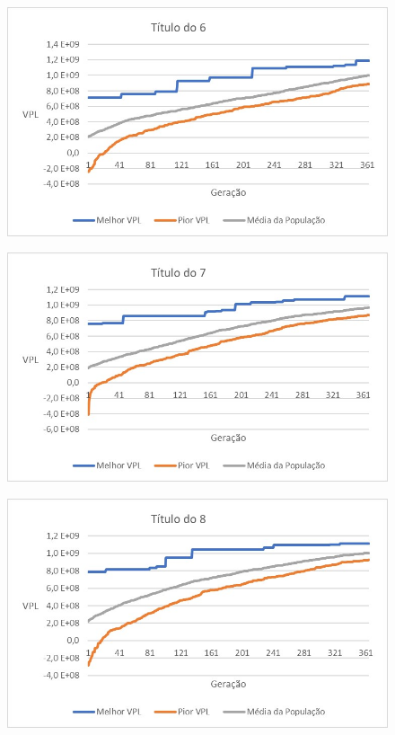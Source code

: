 \documentclass[12pt,a4paper]{report}
\begin{document}
\begin{figure}[H]
\centering

\includegraphics[scale=1]{ApD/6}

\end{figure}

\begin{figure}[H]
\centering

\includegraphics[scale=1]{ApD/7}

\end{figure}

\begin{figure}[H]
\centering

\includegraphics[scale=1]{ApD/8}

\end{figure}
\end{document}
